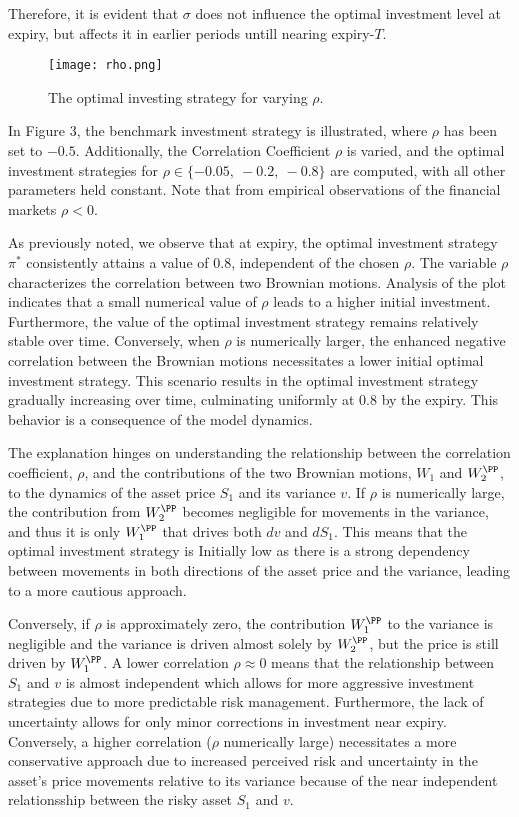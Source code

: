 \documentclass[11pt]{article}
\numberwithin{equation}{section}
\begin{document}
Therefore, it is evident that
$\sigma$ does not influence the optimal investment level at expiry, but affects
it in earlier periods untill nearing expiry-$T$.
\newpage
\begin{figure}[!h]
    \centering
    \hspace*{-2cm}
    \texttt{[image: rho.png]}
    \label{Figure 3}
    \setlength{\abovecaptionskip}{-5pt}
    \caption{The optimal investing strategy for varying $\rho$.}
\end{figure}

In Figure 3, the benchmark investment strategy is illustrated, where $\rho$ has
been set to $-0.5$. Additionally, the Correlation Coefficient $\rho$ is varied, and the
optimal investment strategies for $\rho \in \{-0.05,\: -0.2,\: -0.8\}$ are computed,
with all other parameters held constant. Note that from empirical observations of
the financial markets $\rho<0$.

As previously noted, we observe that at expiry, the optimal investment strategy
$\pi^*$ consistently attains a value of $0.8$, independent of the chosen $\rho$.
The variable $\rho$ characterizes the correlation between two Brownian motions.
Analysis of the plot indicates that a small numerical value of $\rho$
leads to a higher initial investment.
Furthermore, the value of the optimal investment strategy remains relatively
stable over time. Conversely, when $\rho$ is numerically larger, the enhanced negative correlation between the
Brownian motions necessitates a lower initial optimal investment strategy. This
scenario results in the optimal investment strategy gradually increasing over
time, culminating uniformly at $0.8$ by the expiry.  This behavior is a
consequence of the model dynamics.

The explanation hinges on understanding the relationship between the correlation
coefficient, $\rho$, and the contributions of the two Brownian motions, $W_1$
and $W_2^\PP$, to the dynamics of the asset price $S_1$ and its variance $v$.
If $\rho$ is numerically large, the contribution from $W_2^\PP$ becomes negligible
for movements in the variance, and thus it is only $W_1^\PP$ that drives both $dv$ and
$dS_1$. This means that the optimal investment strategy is Initially low as
there is a strong dependency between movements in both directions of the asset
price and the variance, leading to a more cautious approach.

Conversely, if $\rho$ is approximately zero, the contribution $W_1^\PP$ to the
variance is negligible and the variance is driven almost solely by $W_2^\PP$, but the
price is still driven by $W_1^\PP$. A lower correlation $\rho \approx 0$ means
that the relationship between
$S_1$ and $v$ is almost independent which allows for more aggressive investment strategies due to more
predictable risk management. Furthermore, the lack of uncertainty allows for
only minor corrections in investment near expiry. Conversely, a higher correlation ($\rho$ numerically large)
necessitates a more conservative approach due to increased perceived risk and uncertainty
in the asset’s price movements relative to its variance because of the near
independent relationsship between the risky asset $S_1$ and $v$.
\end{document}
